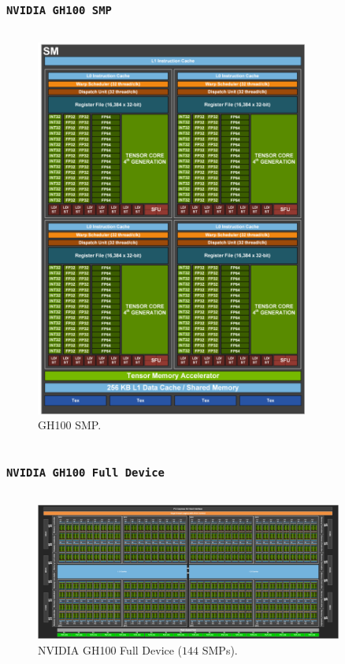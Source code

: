 \begin{frame}
	\frametitle{\texttt{NVIDIA GH100 SMP}} 
    \begin{columns}
    \begin{figure}[H]
       \centering
	    \includegraphics[width=0.80\textwidth]{./img/H100-Streaming-Multiprocessor-SM-1104x1536.png}
	    \caption{\small{GH100 SMP.}}
     \end{figure}
     \end{columns}
\end{frame}

\begin{frame}
        \frametitle{\texttt{NVIDIA GH100 Full Device}}
    \begin{columns}
    \begin{figure}[H]
       \centering
	    \includegraphics[width=0.90\textwidth]{./img/Full-H100-GPU-with-144-SMs-1536x686.png}
	    \caption{\small{NVIDIA GH100 Full Device ($144$ SMPs).}}
     \end{figure}
     \end{columns}
\end{frame}

